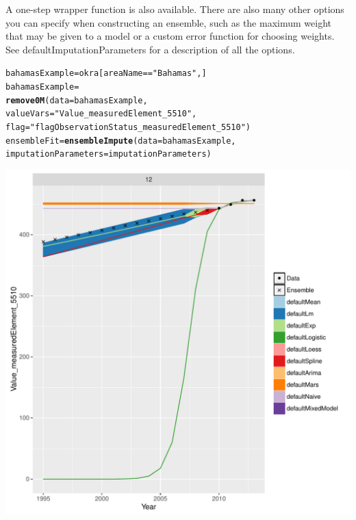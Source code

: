 \documentclass[nojss]{jss}\usepackage[]{graphicx}\usepackage[]{color}
\makeatletter
\def\maxwidth{ %
  \ifdim\Gin@nat@width>\linewidth
    \linewidth
  \else
    \Gin@nat@width
  \fi
}
\newcommand{\hlstr}[1]{\textcolor[rgb]{0.192,0.494,0.8}{#1}}%
\newcommand{\hlopt}[1]{\textcolor[rgb]{0,0,0}{#1}}%
\newcommand{\hlstd}[1]{\textcolor[rgb]{0.345,0.345,0.345}{#1}}%
\newcommand{\hlkwb}[1]{\textcolor[rgb]{0.69,0.353,0.396}{#1}}%
\newcommand{\hlkwc}[1]{\textcolor[rgb]{0.333,0.667,0.333}{#1}}%
\newcommand{\hlkwd}[1]{\textcolor[rgb]{0.737,0.353,0.396}{\textbf{#1}}}%
\newenvironment{kframe}{%
 \def\at@end@of@kframe{}%
 \ifinner\ifhmode%
  \def\at@end@of@kframe{\end{minipage}}%
  \begin{minipage}{\columnwidth}%
 \fi\fi%
 \def\FrameCommand##1{\hskip\@totalleftmargin \hskip-\fboxsep
 \colorbox{shadecolor}{##1}\hskip-\fboxsep
     \hskip-\linewidth \hskip-\@totalleftmargin \hskip\columnwidth}%
 \MakeFramed {\advance\hsize-\width
   \@totalleftmargin\z@ \linewidth\hsize
   \@setminipage}}%
 {\par\unskip\endMakeFramed%
 \at@end@of@kframe}
\newenvironment{knitrout}{}{} %
\makeatother
\begin{document}
A one-step wrapper function is also available.  There are also many other
options you can specify when constructing an ensemble, such as the maximum
weight that may be given to a model or a custom error function for choosing
weights.  See defaultImputationParameters for a description of all the options.

\begin{knitrout}
\color{fgcolor}\begin{kframe}
\begin{alltt}
\hlstd{bahamasExample} \hlkwb{=} \hlstd{okra[areaName} \hlopt{==} \hlstr{"Bahamas"}\hlstd{, ]}
\hlstd{bahamasExample} \hlkwb{=}
    \hlkwd{remove0M}\hlstd{(}\hlkwc{data} \hlstd{= bahamasExample,}
             \hlkwc{valueVars} \hlstd{=} \hlstr{"Value_measuredElement_5510"}\hlstd{,}
             \hlkwc{flag} \hlstd{=} \hlstr{"flagObservationStatus_measuredElement_5510"}\hlstd{)}
\hlstd{ensembleFit} \hlkwb{=} \hlkwd{ensembleImpute}\hlstd{(}\hlkwc{data} \hlstd{= bahamasExample,}
                             \hlkwc{imputationParameters} \hlstd{= imputationParameters)}
\end{alltt}
\end{kframe}

{\centering \includegraphics[width=\maxwidth]{figure/ensemble-imputation-1} 

}



\end{knitrout}
\end{document}
